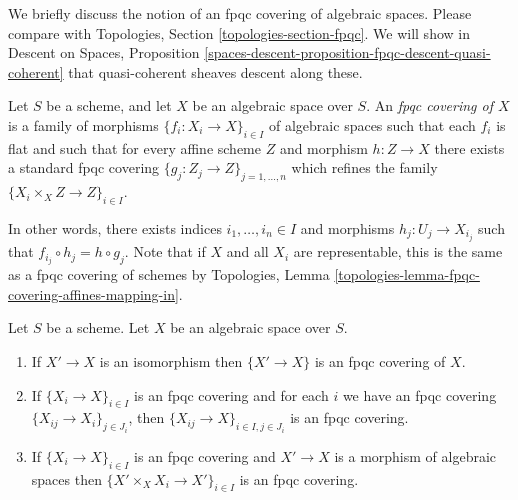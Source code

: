 \noindent
We briefly discuss the notion of an fpqc covering of algebraic spaces.
Please compare with
Topologies, Section \ref{topologies-section-fpqc}.
We will show in
Descent on Spaces,
Proposition \ref{spaces-descent-proposition-fpqc-descent-quasi-coherent}
that quasi-coherent sheaves descent along these.

\begin{definition}
\label{definition-fpqc-covering}
Let $S$ be a scheme, and let $X$ be an algebraic space over $S$.
An {\it fpqc covering of $X$} is a family of morphisms
$\{f_i : X_i \to X\}_{i \in I}$ of algebraic spaces
such that each $f_i$ is flat and such that for every affine scheme
$Z$ and morphism $h : Z \to X$ there exists a standard fpqc covering
$\{g_j : Z_j \to Z\}_{j = 1, \ldots, n}$ which refines the family
$\{X_i \times_X Z \to Z\}_{i \in I}$.
\end{definition}

\noindent
In other words, there exists indices $i_1, \ldots, i_n \in I$ and
morphisms $h_j : U_j \to X_{i_j}$ such that
$f_{i_j} \circ h_j = h \circ g_j$. Note that if $X$ and all $X_i$ are
representable, this is the same as a fpqc covering of schemes by
Topologies, Lemma \ref{topologies-lemma-fpqc-covering-affines-mapping-in}.

\begin{lemma}
\label{lemma-fpqc}
Let $S$ be a scheme.
Let $X$ be an algebraic space over $S$.
\begin{enumerate}
\item If $X' \to X$ is an isomorphism then $\{X' \to X\}$
is an fpqc covering of $X$.
\item If $\{X_i \to X\}_{i\in I}$ is an fpqc covering and for each
$i$ we have an fpqc covering $\{X_{ij} \to X_i\}_{j\in J_i}$, then
$\{X_{ij} \to X\}_{i \in I, j\in J_i}$ is an fpqc covering.
\item If $\{X_i \to X\}_{i\in I}$ is an fpqc covering
and $X' \to X$ is a morphism of algebraic spaces then
$\{X' \times_X X_i \to X'\}_{i\in I}$ is an fpqc covering.
\end{enumerate}
\end{lemma}

